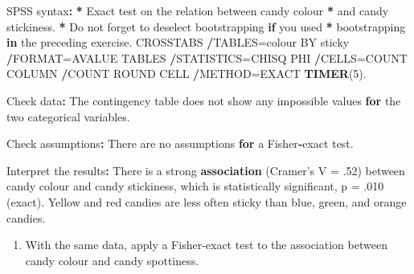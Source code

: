 \documentclass[a4paper]{book}
\newenvironment{Shaded}{\begin{snugshade}}{\end{snugshade}}
\newcommand{\KeywordTok}[1]{\textcolor[rgb]{0,0,0}{\textbf{#1}}}
\newcommand{\DecValTok}[1]{\textcolor[rgb]{0.00,0.00,0.00}{#1}}
\newcommand{\StringTok}[1]{\textcolor[rgb]{0.00,0.00,0.00}{#1}}
\newcommand{\ControlFlowTok}[1]{\textcolor[rgb]{0.00,0.00,0.00}{\textbf{#1}}}
\newcommand{\OperatorTok}[1]{\textcolor[rgb]{0.00,0.00,0.00}{\textbf{#1}}}
\newcommand{\ErrorTok}[1]{\textcolor[rgb]{0.00,0.00,0.00}{\textbf{#1}}}
\newcommand{\NormalTok}[1]{#1}
\providecommand{\tightlist}{%
  \setlength{\itemsep}{0pt}\setlength{\parskip}{0pt}}
\theoremstyle{definition}
\theoremstyle{definition}
\theoremstyle{definition}
\theoremstyle{remark}
\begin{document}
\begin{Shaded}
\begin{Highlighting}[]
\NormalTok{SPSS syntax}\OperatorTok{:}\StringTok{  }
\StringTok{  }
\ErrorTok{*}\StringTok{ }\NormalTok{Exact test on the relation between candy colour  }
\OperatorTok{*}\StringTok{ }\NormalTok{and candy stickiness.  }
\OperatorTok{*}\StringTok{ }\NormalTok{Do not forget to deselect bootstrapping }\ControlFlowTok{if}\NormalTok{ you used }
\OperatorTok{*}\StringTok{ }\NormalTok{bootstrapping }\ControlFlowTok{in}\NormalTok{ the preceding exercise.  }
\NormalTok{CROSSTABS  }
  \OperatorTok{/}\NormalTok{TABLES=colour BY sticky  }
  \OperatorTok{/}\NormalTok{FORMAT=AVALUE TABLES  }
  \OperatorTok{/}\NormalTok{STATISTICS=CHISQ PHI   }
  \OperatorTok{/}\NormalTok{CELLS=COUNT COLUMN   }
  \OperatorTok{/}\NormalTok{COUNT ROUND CELL  }
  \OperatorTok{/}\NormalTok{METHOD=EXACT }\KeywordTok{TIMER}\NormalTok{(}\DecValTok{5}\NormalTok{).  }
  
\NormalTok{Check data}\OperatorTok{:}\StringTok{  }
\StringTok{  }
\NormalTok{The contingency table does not show any impossible values }\ControlFlowTok{for}  
\NormalTok{the two categorical variables.  }
  
\NormalTok{Check assumptions}\OperatorTok{:}\StringTok{  }
\StringTok{  }
\NormalTok{There are no assumptions }\ControlFlowTok{for}\NormalTok{ a Fisher}\OperatorTok{-}\NormalTok{exact test.  }
  
\NormalTok{Interpret the results}\OperatorTok{:}\StringTok{  }
\StringTok{  }
\NormalTok{There is a strong }\KeywordTok{association}\NormalTok{ (Cramer}\StringTok{'s V = .52) between candy colour and}
\StringTok{candy stickiness, which is statistically significant, p = .010 (exact). Yellow}
\StringTok{and red candies are less often sticky than blue, green, and orange candies.}
\end{Highlighting}
\end{Shaded}

\begin{enumerate}
\def\labelenumi{\arabic{enumi}.}
\setcounter{enumi}{1}
\tightlist
\item
  With the same data, apply a Fisher-exact test to the association
  between candy colour and candy spottiness.
\end{enumerate}
\end{document}
